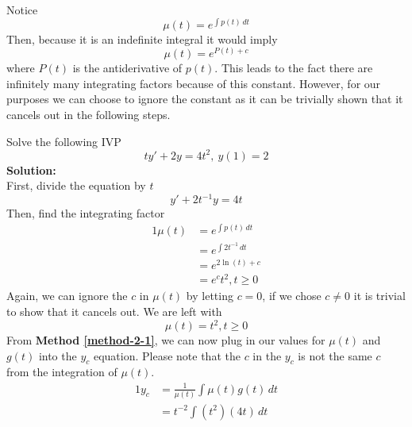 \documentclass[diffeq.tex]{subfiles}
\begin{document}
    \begin{remark}
        Notice
        \begin{equation}
            \mu(t) = e^{\int p(t)\,dt}
        \end{equation}
        Then, because it is an indefinite integral it would imply
        \begin{equation}
            \mu(t) = e^{P(t) + c}
        \end{equation}
        where $P(t)$ is the antiderivative of $p(t)$. This leads to the fact there are infinitely many integrating factors because of this constant. However, for our purposes we can choose to ignore the constant as it can be trivially shown that it cancels out in the following steps.
    \end{remark}
    \np
    \begin{example}
        \label{ex2-3}
        Solve the following IVP
        \begin{equation}
            ty' + 2y = 4t^{2},\ y(1) = 2
        \end{equation}
        \textbf{Solution:}\\
        First, divide the equation by $t$
        \begin{equation}
            y' + 2t^{-1}y = 4t
        \end{equation}
        Then, find the integrating factor
        \begin{alignat}{1}
            \mu(t) &= e^{\int p(t)\,dt}\\
            &= e^{\int 2t^{-1}\,dt}\\
            &= e^{2\ln(t) + c}\\
            &= e^{c}t^{2}, t \geq 0
        \end{alignat}
        Again, we can ignore the $c$ in $\mu(t)$ by letting $c = 0$, if we chose $c \neq 0$ it is trivial to show that it cancels out. We are left with
        \begin{equation}
            \mu(t) = t^{2}, t \geq 0
        \end{equation}
        From \textbf{Method \ref{method-2-1}}, we can now plug in our values for $\mu(t)$ and $g(t)$ into the $y_{c}$ equation. Please note that the $c$ in the $y_{c}$ is not the same $c$ from the integration of $\mu(t)$.
        \begin{alignat}{1}
            y_{c} &= \frac{1}{\mu(t)}\int \mu(t)g(t)\,dt\\
            &= t^{-2} \int (t^{2})(4t)\,dt\\

\end{alignat}
\end{example}
\end{document}

